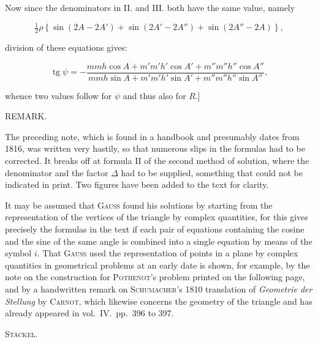 Now since the denominators in II. and III. both have the same value, namely

\[
\tfrac{1}{2}\rho\left\{\sin(2A-2A')+\sin(2A'-2A'')+\sin(2A''-2A)\right\},
\]

division of these equations gives:

\[
\operatorname{tg}\psi = -\dfrac{mmh\cos A+m'm'h'\cos A'+m''m''h''\cos A''}{mmh\sin A+m'm'h'\sin A'+m''m''h''\sin A''},
\]

whence two values follow for $\psi$ and thus also for $R$.]

\bigskip
\begin{center}
\hrulefill
\end{center}
\bigskip

\begin{center}
REMARK.
\end{center}

The preceding note, which is found in a handbook and presumably dates from 1816, was written very hastily, so that numerous slips in the formulas had to be corrected. It breaks off at formula II of the second method of solution, where the denominator and the factor $\Delta$ had to be supplied, something that could not be indicated in print. Two figures have been added to the text for clarity.

It may be assumed that \textsc{Gauss} found his solutions by starting from the representation of the vertices of the triangle by complex quantities, for this gives precisely the formulas in the text if each pair of equations containing the cosine and the sine of the same angle is combined into a single equation by means of the symbol $i$. That \textsc{Gauss} used the representation of points in a plane by complex quantities in geometrical problems at an early date is shown, for example, by the note on the construction for \textsc{Pothenot}'s problem printed on the following page, and by a handwritten remark on \textsc{Schumacher}'s 1810 translation of \emph{Geometrie der Stellung} by \textsc{Carnot}, which likewise concerns the geometry of the triangle and has already appeared in vol.\ IV.\ pp.\ 396 to 397.

\hfill \textsc{Stäckel}.

\bigskip
\begin{center}
\hrulefill
\end{center}

